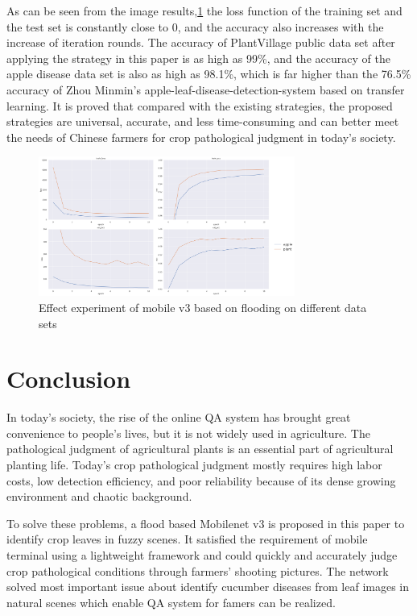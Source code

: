 \documentclass[a4paper,fleqn]{cas-sc}
\begin{document}
As can be seen from the image results,\ref{fig:f9} the loss function of the training set and the test set is constantly close to 0, and the accuracy also increases with the increase of iteration rounds. The accuracy of PlantVillage public data set after applying the strategy in this paper is as high as 99\%, and the accuracy of the apple disease data set is also as high as 98.1\%, which is far higher than the 76.5\% accuracy of Zhou Minmin's apple-leaf-disease-detection-system based on transfer learning.\citep{ZhouMing} It is proved that compared with the existing strategies, the proposed strategies are universal, accurate, and less time-consuming and can better meet the needs of Chinese farmers for crop pathological judgment in today's society.
\begin{figure}
\centering
\includegraphics[width=0.75\textwidth]{figs_rev1/f9.png}
\caption{Effect experiment of mobile v3 based on flooding on different data sets}
\label{fig:f9}
\end{figure}

\section{Conclusion}
In today's society, the rise of the online QA system has brought great convenience to people's lives, but it is not widely used in agriculture. The pathological judgment of agricultural plants is an essential part of agricultural planting life. Today's crop pathological judgment mostly requires high labor costs, low detection efficiency, and poor reliability because of its dense growing environment and chaotic background. 

To solve these problems, a flood based Mobilenet v3 is proposed in this paper to identify crop leaves in fuzzy scenes. It satisfied the requirement of mobile terminal using a lightweight framework and could quickly and accurately judge crop pathological conditions through farmers' shooting pictures. The network solved most important issue about identify cucumber diseases from leaf
images in natural scenes which enable QA system for famers can be realized.
\end{document}
